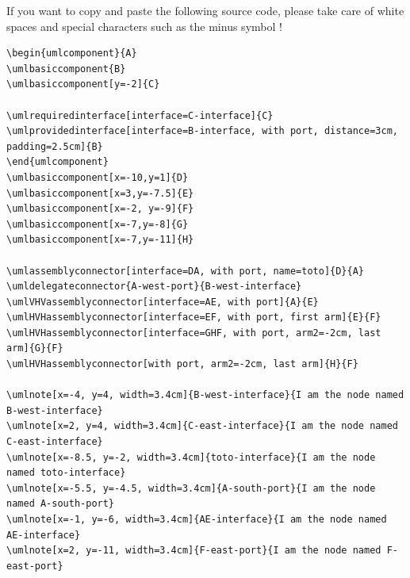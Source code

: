 \documentclass[a4paper,11pt, svgnames]{article}
\date{}
\title{}
\author{}
\begin{document}
\maketitle

If you want to copy and paste the following source code, please take care of white spaces and special characters such as the minus symbol !

\medskip
\lstset{breaklines=true, frame=trBL, language=tikzuml}
\begin{lstlisting}
\begin{umlcomponent}{A}
\umlbasiccomponent{B}
\umlbasiccomponent[y=-2]{C}

\umlrequiredinterface[interface=C-interface]{C}
\umlprovidedinterface[interface=B-interface, with port, distance=3cm, padding=2.5cm]{B}
\end{umlcomponent}
\umlbasiccomponent[x=-10,y=1]{D}
\umlbasiccomponent[x=3,y=-7.5]{E}
\umlbasiccomponent[x=-2, y=-9]{F}
\umlbasiccomponent[x=-7,y=-8]{G}
\umlbasiccomponent[x=-7,y=-11]{H}

\umlassemblyconnector[interface=DA, with port, name=toto]{D}{A}
\umldelegateconnector{A-west-port}{B-west-interface}
\umlVHVassemblyconnector[interface=AE, with port]{A}{E}
\umlHVHassemblyconnector[interface=EF, with port, first arm]{E}{F}
\umlHVHassemblyconnector[interface=GHF, with port, arm2=-2cm, last arm]{G}{F}
\umlHVHassemblyconnector[with port, arm2=-2cm, last arm]{H}{F}

\umlnote[x=-4, y=4, width=3.4cm]{B-west-interface}{I am the node named B-west-interface}
\umlnote[x=2, y=4, width=3.4cm]{C-east-interface}{I am the node named C-east-interface}
\umlnote[x=-8.5, y=-2, width=3.4cm]{toto-interface}{I am the node named toto-interface}
\umlnote[x=-5.5, y=-4.5, width=3.4cm]{A-south-port}{I am the node named A-south-port}
\umlnote[x=-1, y=-6, width=3.4cm]{AE-interface}{I am the node named AE-interface}
\umlnote[x=2, y=-11, width=3.4cm]{F-east-port}{I am the node named F-east-port}
\end{lstlisting}
\end{document}
